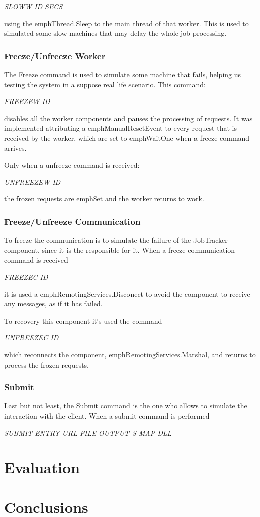 \documentclass[times, 10pt,twocolumn]{article}
\begin{document}
            \emph{SLOWW ID SECS}
            
			using the emph{Thread.Sleep} to the main thread of that worker. This is used to simulated some slow machines that may delay the whole job processing.
            
            \subsubsection{Freeze/Unfreeze Worker} \label{freeze}
            The Freeze command is used to simulate some machine that fails, helping us testing the system in a suppose real life scenario. This command: 
            
            \emph{FREEZEW ID}
            
            disables all the worker components and pauses the processing of requests.
            It was implemented attributing a emph{ManualResetEvent} to every request that is received by the worker, which are set to emph{WaitOne} when a freeze command arrives.
            
            Only when a unfreeze command is received:
            
            \emph{UNFREEZEW ID}
            
            the frozen requests are emph{Set} and the worker returns to work.

            \subsubsection{Freeze/Unfreeze Communication}
            To freeze the communication is to simulate the failure of the JobTracker component, since it is the responsible for it. When a freeze communication command is received
            
	        \emph{FREEZEC ID}
	        
	        it is used a emph{RemotingServices.Disconect} to avoid the component to receive any messages, as if it has failed.
	        
	        To recovery this component it's used the command
	        
	        \emph{UNFREEZEC ID}
	        
	        which reconnects the component, emph{RemotingServices.Marshal}, and returns to process the frozen requests.
            
            \subsubsection{Submit}   
            Last but not least, the Submit command is the one who allows to simulate the interaction with the client. When a submit command is performed
            
            \emph{SUBMIT ENTRY-URL FILE OUTPUT S MAP DLL}
            
            
	
	\section{Evaluation}
	
	\section{Conclusions}
	
	
	
\end{document}
